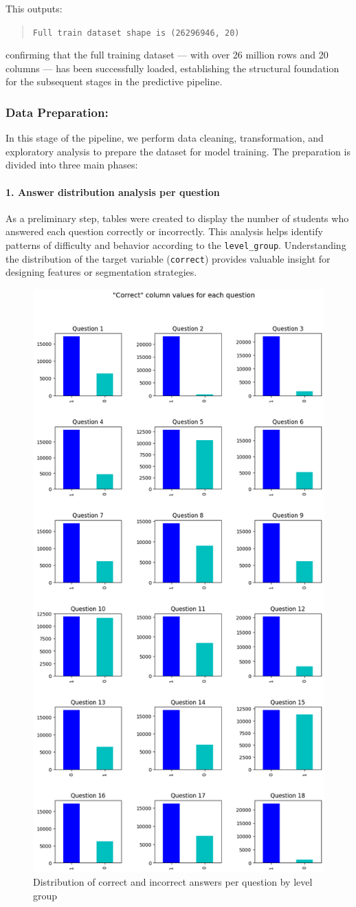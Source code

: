 \documentclass[12pt]{article}
\begin{document}
	This outputs:
	
	\begin{quote}
		\texttt{Full train dataset shape is (26296946, 20)}
	\end{quote}
	
	confirming that the full training dataset --- with over 26 million rows and 20 columns --- has been successfully loaded, establishing the structural foundation for the subsequent stages in the predictive pipeline.
	
	
	
	\subsubsection{Data Preparation:}
	In this stage of the pipeline, we perform data cleaning, transformation, and exploratory analysis to prepare the dataset for model training. The preparation is divided into three main phases:
	
	\paragraph{1. Answer distribution analysis per question}
	
	As a preliminary step, tables were created to display the number of students who answered each question correctly or incorrectly. This analysis helps identify patterns of difficulty and behavior according to the \texttt{level\_group}. Understanding the distribution of the target variable (\texttt{correct}) provides valuable insight for designing features or segmentation strategies.
	
	\begin{figure}[H]
		\centering
		\includegraphics[width=0.3\linewidth]{src/PQR.png}
		\caption{Distribution of correct and incorrect answers per question by level group}
		\label{fig:answer-distribution}
	\end{figure}
	
\end{document}
